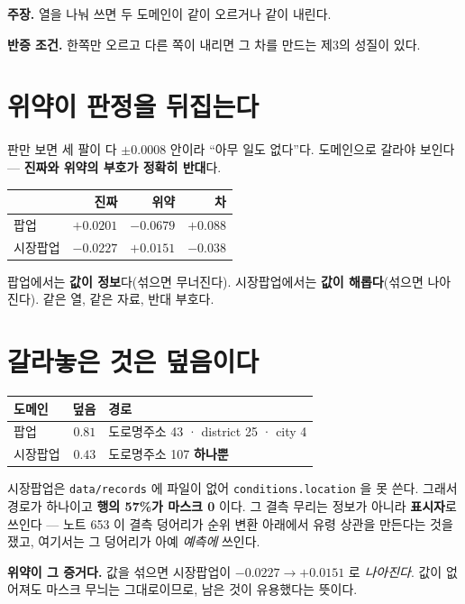 \documentclass[10pt,a4paper]{article}
\newcommand{\claim}[2]{\begin{claimbox}\textbf{주장.} #1\par\smallskip
  \textcolor{gray!70}{\textbf{반증 조건.} #2}\end{claimbox}}
\begin{document}
\claim{열을 나눠 쓰면 두 도메인이 같이 오르거나 같이 내린다.}{한쪽만 오르고
다른 쪽이 내리면 그 차를 만드는 제3의 성질이 있다.}

\section{위약이 판정을 뒤집는다}

판만 보면 세 팔이 다 $\pm0.0008$ 안이라 ``아무 일도 없다''다. 도메인으로 갈라야
보인다 --- \textbf{진짜와 위약의 부호가 정확히 반대}다.

\begin{center}\small
\begin{tabular}{lrrr}\toprule
& 진짜 & 위약 & 차 \\ \midrule
팝업 & $+0.0201$ & $-0.0679$ & $\mathbf{+0.088}$ \\
시장팝업 & $-0.0227$ & $+0.0151$ & $-0.038$ \\ \bottomrule
\end{tabular}\end{center}

팝업에서는 \textbf{값이 정보}다(섞으면 무너진다). 시장팝업에서는 \textbf{값이
해롭다}(섞으면 나아진다). 같은 열, 같은 자료, 반대 부호다.

\section{갈라놓은 것은 덮음이다}

\begin{center}\small
\begin{tabular}{lrl}\toprule
도메인 & 덮음 & 경로 \\ \midrule
팝업 & $0.81$ & 도로명주소 43 · district 25 · city 4 \\
시장팝업 & $\mathbf{0.43}$ & 도로명주소 107 \textbf{하나뿐} \\ \bottomrule
\end{tabular}\end{center}

시장팝업은 \verb|data/records| 에 파일이 없어 \verb|conditions.location| 을 못
쓴다. 그래서 경로가 하나이고 \textbf{행의 57\%가 마스크 0} 이다. 그 결측 무리는
정보가 아니라 \textbf{표시자}로 쓰인다 --- 노트 653 이 결측 덩어리가 순위 변환
아래에서 유령 상관을 만든다는 것을 쟀고, 여기서는 그 덩어리가 아예
\emph{예측에} 쓰인다.

\textbf{위약이 그 증거다.} 값을 섞으면 시장팝업이 $-0.0227 \to +0.0151$ 로
\emph{나아진다}. 값이 없어져도 마스크 무늬는 그대로이므로, 남은 것이 유용했다는
뜻이다.
\end{document}
